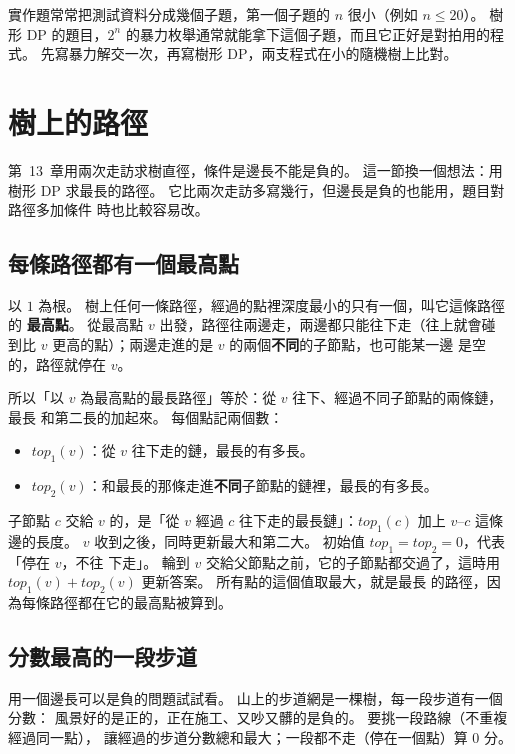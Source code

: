 \begin{apcsnote}
實作題常常把測試資料分成幾個子題，第一個子題的 $n$ 很小（例如 $n \le 20$）。 樹
形 DP 的題目，$2^n$ 的暴力枚舉通常就能拿下這個子題，而且它正好是對拍用的程式。
先寫暴力解交一次，再寫樹形 DP，兩支程式在小的隨機樹上比對。
\end{apcsnote}

\section{樹上的路徑}
\label{sec:tdp-path}

第~13~章用兩次走訪求樹直徑，條件是邊長不能是負的。 這一節換一個想法：用樹形
DP 求最長的路徑。 它比兩次走訪多寫幾行，但邊長是負的也能用，題目對路徑多加條件
時也比較容易改。

\subsection{每條路徑都有一個最高點}

以 $1$ 為根。 樹上任何一條路徑，經過的點裡深度最小的只有一個，叫它這條路徑的
\textbf{最高點}。 從最高點 $v$ 出發，路徑往兩邊走，兩邊都只能往下走（往上就會碰
到比 $v$ 更高的點）；兩邊走進的是 $v$ 的兩個\textbf{不同}的子節點，也可能某一邊
是空的，路徑就停在 $v$。

所以「以 $v$ 為最高點的最長路徑」等於：從 $v$ 往下、經過不同子節點的兩條鏈，最長
和第二長的加起來。 每個點記兩個數：

\begin{itemize}
\item $\mathit{top}_1(v)$：從 $v$ 往下走的鏈，最長的有多長。
\item $\mathit{top}_2(v)$：和最長的那條走進\textbf{不同}子節點的鏈裡，最長的有多長。
\end{itemize}

子節點 $c$ 交給 $v$ 的，是「從 $v$ 經過 $c$ 往下走的最長鏈」：$\mathit{top}_1(c)$
加上 $v$--$c$ 這條邊的長度。 $v$ 收到之後，同時更新最大和第二大。 初始值 $\mathit{top}_1 = \mathit{top}_2 = 0$，代表「停在 $v$，不往
下走」。 輪到 $v$ 交給父節點之前，它的子節點都交過了，這時用
$\mathit{top}_1(v) + \mathit{top}_2(v)$ 更新答案。 所有點的這個值取最大，就是最長
的路徑，因為每條路徑都在它的最高點被算到。

\subsection{分數最高的一段步道}

用一個邊長可以是負的問題試試看。 山上的步道網是一棵樹，每一段步道有一個分數：
風景好的是正的，正在施工、又吵又髒的是負的。 要挑一段路線（不重複經過同一點），
讓經過的步道分數總和最大；一段都不走（停在一個點）算 $0$ 分。

